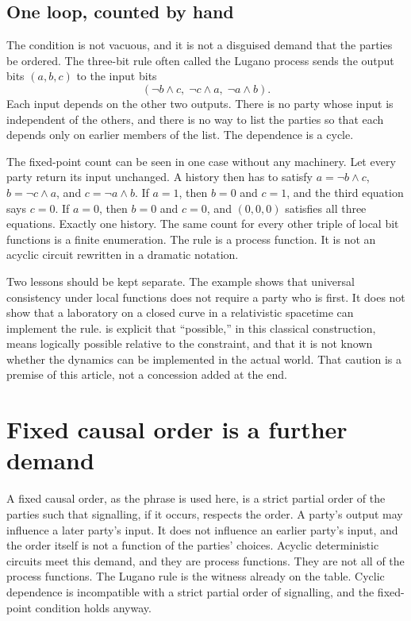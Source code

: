 \documentclass[11pt]{article}
\begin{document}
\subsection{One loop, counted by hand}
\label{sec:lugano}

The condition is not vacuous, and it is not a disguised demand that the parties be ordered. The three-bit rule often called the Lugano process sends the output bits \((a,b,c)\) to the input bits
\[
(\lnot b \land c,\; \lnot c \land a,\; \lnot a \land b).
\]
Each input depends on the other two outputs. There is no party whose input is independent of the others, and there is no way to list the parties so that each depends only on earlier members of the list. The dependence is a cycle.

The fixed-point count can be seen in one case without any machinery. Let every party return its input unchanged. A history then has to satisfy \(a = \lnot b \land c\), \(b = \lnot c \land a\), and \(c = \lnot a \land b\). If \(a = 1\), then \(b = 0\) and \(c = 1\), and the third equation says \(c = 0\). If \(a = 0\), then \(b = 0\) and \(c = 0\), and \((0,0,0)\) satisfies all three equations. Exactly one history. The same count for every other triple of local bit functions is a finite enumeration. The rule is a process function. It is not an acyclic circuit rewritten in a dramatic notation.

Two lessons should be kept separate. The example shows that universal consistency under local functions does not require a party who is first. It does not show that a laboratory on a closed curve in a relativistic spacetime can implement the rule. \citet{adlam2023} is explicit that ``possible,'' in this classical construction, means logically possible relative to the constraint, and that it is not known whether the dynamics can be implemented in the actual world. That caution is a premise of this article, not a concession added at the end.

\section{Fixed causal order is a further demand}
\label{sec:order}

A fixed causal order, as the phrase is used here, is a strict partial order of the parties such that signalling, if it occurs, respects the order. A party's output may influence a later party's input. It does not influence an earlier party's input, and the order itself is not a function of the parties' choices. Acyclic deterministic circuits meet this demand, and they are process functions. They are not all of the process functions. The Lugano rule is the witness already on the table. Cyclic dependence is incompatible with a strict partial order of signalling, and the fixed-point condition holds anyway.
\end{document}
